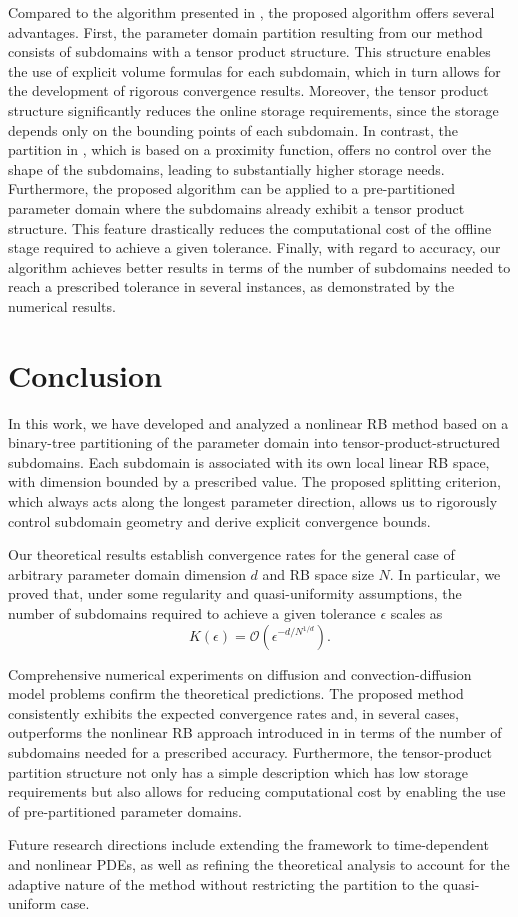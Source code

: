 \documentclass[12pt]{article}
\theoremstyle{remark}
\theoremstyle{definition}
\numberwithin{equation}{section}
\begin{document}
Compared to the algorithm presented in \cite{eftang2010hp}, the proposed algorithm offers several advantages. First, the parameter domain partition resulting from our method consists of subdomains with a tensor product structure. This structure enables the use of explicit volume formulas for each subdomain, which in turn allows for the development of rigorous convergence results. Moreover, the tensor product structure significantly reduces the online storage requirements, since the storage depends only on the bounding points of each subdomain. In contrast, the partition in \cite{eftang2010hp}, which is based on a proximity function, offers no control over the shape of the subdomains, leading to substantially higher storage needs. Furthermore, the proposed algorithm can be applied to a pre-partitioned parameter domain where the subdomains already exhibit a tensor product structure. This feature drastically reduces the computational cost of the offline stage required to achieve a given tolerance. Finally, with regard to accuracy, our algorithm achieves better results in terms of the number of subdomains needed to reach a prescribed tolerance in several instances, as demonstrated by the numerical results.

\section{Conclusion}

In this work, we have developed and analyzed a nonlinear RB method based on a binary-tree partitioning of the parameter domain into tensor-product-structured subdomains. Each subdomain is associated with its own local linear RB space, with dimension bounded by a prescribed value. The proposed splitting criterion, which always acts along the longest parameter direction, allows us to rigorously control subdomain geometry and derive explicit convergence bounds.

Our theoretical results establish convergence rates for the general case of arbitrary parameter domain dimension $d$ and RB space size $N$. In particular, we proved that, under some regularity and quasi-uniformity assumptions, the number of subdomains required to achieve a given tolerance $\epsilon$ scales as
\[
K(\epsilon) = \mathcal{O}\left( \epsilon^{-d/N^{1/d}} \right).
\]

Comprehensive numerical experiments on diffusion and convection-diffusion model problems confirm the theoretical predictions. The proposed method consistently exhibits the expected convergence rates and, in several cases, outperforms the nonlinear RB approach introduced in \cite{eftang2010hp} in terms of the number of subdomains needed for a prescribed accuracy. Furthermore, the tensor-product partition structure not only has a simple description which has low storage requirements but also allows for reducing computational cost by enabling the use of pre-partitioned parameter domains.

Future research directions include extending the framework to time-dependent and nonlinear PDEs, as well as refining the theoretical analysis to account for the adaptive nature of the method without restricting the partition to the quasi-uniform case.




\end{document}
